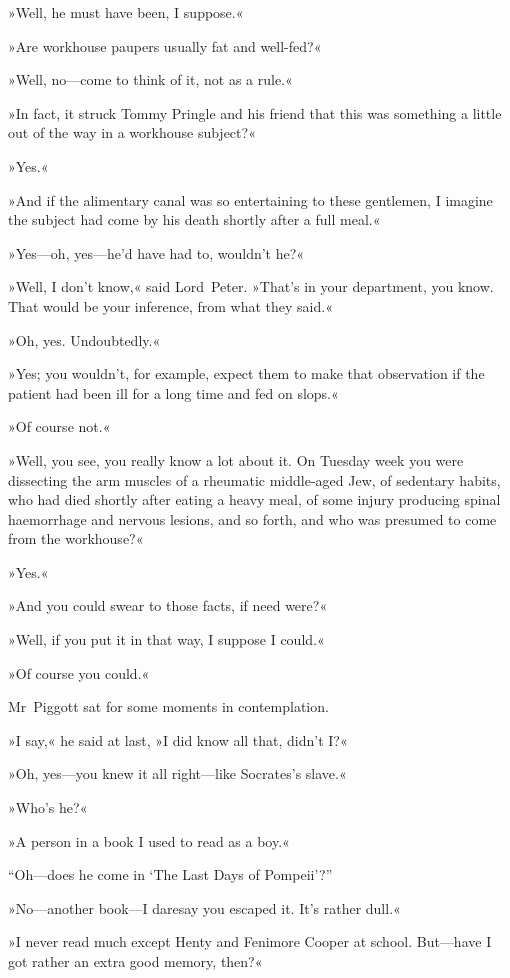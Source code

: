 »Well, he must have been, I suppose.«

»Are workhouse paupers usually fat and well-fed?«

»Well, no—come to think of it, not as a rule.«

»In fact, it struck Tommy Pringle and his friend that this was something a little out of the way in a workhouse subject?«

»Yes.«

»And if the alimentary canal was so entertaining to these gentlemen, I imagine the subject had come by his death shortly after a full meal.«

»Yes—oh, yes—he'd have had to, wouldn't he?«

»Well, I don't know,« said Lord~Peter. »That's in your department, you know. That would be your inference, from what they said.«

»Oh, yes. Undoubtedly.«

»Yes; you wouldn't, for example, expect them to make that observation if the patient had been ill for a long time and fed on slops.«

»Of course not.«

»Well, you see, you really know a lot about it. On Tuesday week you were dissecting the arm muscles of a rheumatic middle-aged Jew, of sedentary habits, who had died shortly after eating a heavy meal, of some injury producing spinal haemorrhage and nervous lesions, and so forth, and who was presumed to come from the workhouse?«

»Yes.«

»And you could swear to those facts, if need were?«

»Well, if you put it in that way, I suppose I could.«

»Of course you could.«

Mr~Piggott sat for some moments in contemplation.

»I say,« he said at last, »I did know all that, didn't I\@?«

»Oh, yes—you knew it all right—like Socrates's slave.«

»Who's he?«

»A person in a book I used to read as a boy.«

“Oh—does he come in ‘The Last Days of Pompeii'?”

»No—another book—I daresay you escaped it. It's rather dull.«

»I never read much except Henty and Fenimore Cooper at school\textellipsis . But—have I got rather an extra good memory, then?«

